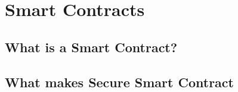 \section{Smart Contracts}\label{sec::smartcontracts}

\subsection{What is a Smart Contract?}

\subsection{What makes Secure Smart Contract}